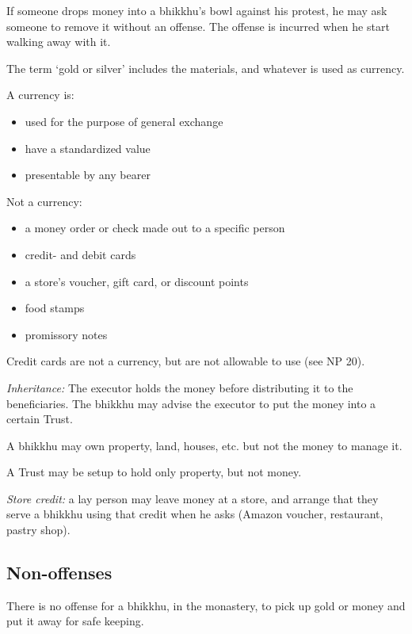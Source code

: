 If someone drops money into a bhikkhu's bowl against his protest, he may
ask someone to remove it without an offense. The offense is incurred
when he start walking away with it.

The term `gold or silver' includes the materials, and whatever is used
as currency.

\enlargethispage*{\baselineskip}

A currency is:

\begin{itemize}
\tightlist
\item
  used for the purpose of general exchange
\item
  have a standardized value
\item
  presentable by any bearer
\end{itemize}

\clearpage

Not a currency:

\begin{itemize}
\tightlist
\item
  a money order or check made out to a specific person
\item
  credit- and debit cards
\item
  a store's voucher, gift card, or discount points
\item
  food stamps
\item
  promissory notes
\end{itemize}

Credit cards are not a currency, but are not allowable to use (see NP
20).

\emph{Inheritance:} The executor holds the money before distributing it
to the beneficiaries. The bhikkhu may advise the executor to put the
money into a certain Trust.

A bhikkhu may own property, land, houses, etc. but not the money to
manage it.

A Trust may be setup to hold only property, but not money.

\emph{Store credit:} a lay person may leave money at a store, and
arrange that they serve a bhikkhu using that credit when he asks (Amazon
voucher, restaurant, pastry shop).

\subsection{Non-offenses}

There is no offense for a bhikkhu, in the monastery, to pick up gold or
money and put it away for safe keeping.

